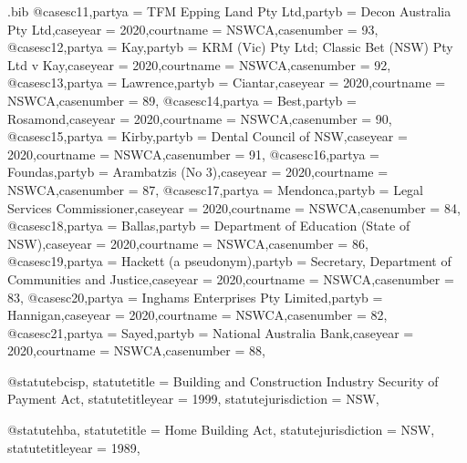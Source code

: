 

\begin{filecontents*}{\jobname.bib}
@case{sc11,partya = {TFM Epping Land Pty Ltd},partyb = {Decon Australia Pty Ltd},caseyear = {2020},courtname = {NSWCA},casenumber = {93},}
@case{sc12,partya = {Kay},partyb = {KRM (Vic) Pty Ltd; Classic Bet (NSW) Pty Ltd v Kay},caseyear = {2020},courtname = {NSWCA},casenumber = {92},}
@case{sc13,partya = {Lawrence},partyb = {Ciantar},caseyear = {2020},courtname = {NSWCA},casenumber = {89},}
@case{sc14,partya = {Best},partyb = {Rosamond},caseyear = {2020},courtname = {NSWCA},casenumber = {90},}
@case{sc15,partya = {Kirby},partyb = {Dental Council of NSW},caseyear = {2020},courtname = {NSWCA},casenumber = {91},}
@case{sc16,partya = {Foundas},partyb = {Arambatzis (No 3)},caseyear = {2020},courtname = {NSWCA},casenumber = {87},}
@case{sc17,partya = {Mendonca},partyb = {Legal Services Commissioner},caseyear = {2020},courtname = {NSWCA},casenumber = {84},}
@case{sc18,partya = {Ballas},partyb = {Department of Education (State of NSW)},caseyear = {2020},courtname = {NSWCA},casenumber = {86},}
@case{sc19,partya = {Hackett (a pseudonym)},partyb = {Secretary, Department of Communities and Justice},caseyear = {2020},courtname = {NSWCA},casenumber = {83},}
@case{sc20,partya = {Inghams Enterprises Pty Limited},partyb = {Hannigan},caseyear = {2020},courtname = {NSWCA},casenumber = {82},}
@case{sc21,partya = {Sayed},partyb = {National Australia Bank},caseyear = {2020},courtname = {NSWCA},casenumber = {88},}


@statute{bcisp,
statutetitle = {Building and Construction Industry Security of Payment Act},
statutetitleyear = {1999},
statutejurisdiction = {NSW},
}


@statute{hba,
statutetitle = {Home Building Act},
statutejurisdiction = {NSW},
statutetitleyear = {1989},
}

\end{filecontents*}



\documentclass[12pt]{article}
\newcommand\rulesep{\rule{0.4\textwidth}{.4pt}}
\usepackage[table]{xcolor}
\pagecolor{blue!3}
\usepackage{fontspec}
\setmainfont{Noto Serif}




\newcommand\abibname{lawcite}
\newcommand\abibstyle{style=\abibname}
\usepackage[
	\abibstyle , 
	indexing=cite,
	citetracker=true,
	ibidtracker=true,
	pagetracker=true,
	idemtracker=true,
	opcittracker=true,
	loccittracker=true,
	autocite=footnote,
   datezeros=true,
	lawcitestyle=default,
	use-toc-parnumrefs=true,
		]{biblatex}

